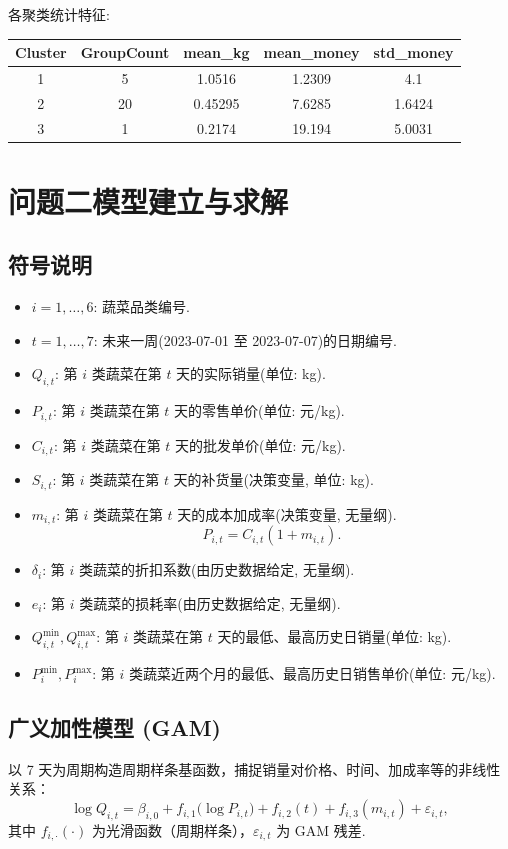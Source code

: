 \documentclass{cumcmthesis}
\begin{document}
各聚类统计特征:
\begin{table}[H]
    \centering
    \begin{tabular}{c c c c c}
    \toprule
    Cluster & GroupCount & mean\_kg & mean\_money & std\_money \\
    \midrule
    1 & 5 & 1.0516 & 1.2309 & 4.1 \\
    2 & 20 & 0.45295 & 7.6285 & 1.6424 \\
    3 & 1 & 0.2174 & 19.194 & 5.0031 \\
    \bottomrule
    \end{tabular}
\end{table}

\section{问题二模型建立与求解}

\subsection{符号说明}
\begin{itemize}
\item $i = 1,\dots,6$: 蔬菜品类编号.
\item $t = 1,\dots,7$: 未来一周(2023-07-01 至 2023-07-07)的日期编号.
\item $Q_{i,t}$: 第 $i$ 类蔬菜在第 $t$ 天的实际销量(单位: kg).
\item $P_{i,t}$: 第 $i$ 类蔬菜在第 $t$ 天的零售单价(单位: 元/kg).
\item $C_{i,t}$: 第 $i$ 类蔬菜在第 $t$ 天的批发单价(单位: 元/kg).
\item $S_{i,t}$: 第 $i$ 类蔬菜在第 $t$ 天的补货量(决策变量, 单位: kg).
\item $m_{i,t}$: 第 $i$ 类蔬菜在第 $t$ 天的成本加成率(决策变量, 无量纲).
      \[
      P_{i,t}=C_{i,t}(1+m_{i,t}).
      \]
\item $\delta_i$: 第 $i$ 类蔬菜的折扣系数(由历史数据给定, 无量纲).
\item $e_i$: 第 $i$ 类蔬菜的损耗率(由历史数据给定, 无量纲).
\item $Q_{i,t}^{\min}, Q_{i,t}^{\max}$: 第 $i$ 类蔬菜在第 $t$ 天的最低、最高历史日销量(单位: kg).
\item $P_{i}^{\min}, P_{i}^{\max}$: 第 $i$ 类蔬菜近两个月的最低、最高历史日销售单价(单位: 元/kg).
\end{itemize}

\subsection{广义加性模型 (GAM)} 
以 7 天为周期构造周期样条基函数，捕捉销量对价格、时间、加成率等的非线性关系：
\begin{equation}
\log Q_{i,t} = \beta_{i,0} 
+ f_{i,1}\bigl(\log P_{i,t}\bigr) 
+ f_{i,2}(t) 
+ f_{i,3}(m_{i,t}) 
+ \varepsilon_{i,t},
\label{eq:GAM}
\end{equation}
其中 $f_{i,\cdot}(\cdot)$ 为光滑函数（周期样条），$\varepsilon_{i,t}$ 为 GAM 残差.
\end{document}
